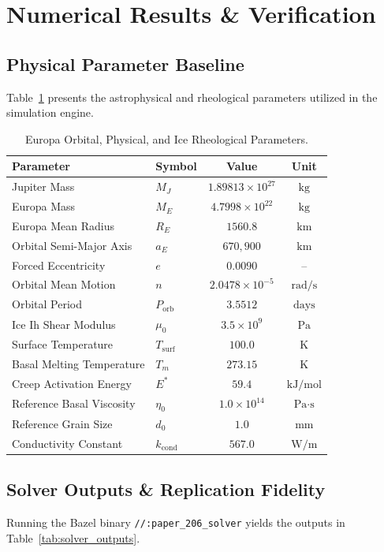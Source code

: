 \documentclass[11pt,a4paper]{article}
\begin{document}
\section{Numerical Results \& Verification}

\subsection{Physical Parameter Baseline}
Table~\ref{tab:europa_params} presents the astrophysical and rheological parameters utilized in the simulation engine.

\begin{table}[htbp]
\centering
\caption{Europa Orbital, Physical, and Ice Rheological Parameters.}
\label{tab:europa_params}
\begin{tabular}{llcc}
\toprule
\textbf{Parameter} & \textbf{Symbol} & \textbf{Value} & \textbf{Unit} \\
\midrule
Jupiter Mass & $M_J$ & $1.89813 \times 10^{27}$ & $\text{kg}$ \\
Europa Mass & $M_E$ & $4.7998 \times 10^{22}$ & $\text{kg}$ \\
Europa Mean Radius & $R_E$ & $1560.8$ & $\text{km}$ \\
Orbital Semi-Major Axis & $a_E$ & $670,900$ & $\text{km}$ \\
Forced Eccentricity & $e$ & $0.0090$ & -- \\
Orbital Mean Motion & $n$ & $2.0478 \times 10^{-5}$ & $\text{rad/s}$ \\
Orbital Period & $P_{\mathrm{orb}}$ & $3.5512$ & $\text{days}$ \\
Ice Ih Shear Modulus & $\mu_0$ & $3.5 \times 10^9$ & $\text{Pa}$ \\
Surface Temperature & $T_{\mathrm{surf}}$ & $100.0$ & $\text{K}$ \\
Basal Melting Temperature & $T_m$ & $273.15$ & $\text{K}$ \\
Creep Activation Energy & $E^*$ & $59.4$ & $\text{kJ/mol}$ \\
Reference Basal Viscosity & $\eta_0$ & $1.0 \times 10^{14}$ & $\text{Pa}\cdot\text{s}$ \\
Reference Grain Size & $d_0$ & $1.0$ & $\text{mm}$ \\
Conductivity Constant & $k_{\mathrm{cond}}$ & $567.0$ & $\text{W/m}$ \\
\bottomrule
\end{tabular}
\end{table}

\subsection{Solver Outputs \& Replication Fidelity}
Running the Bazel binary \texttt{//:paper\_206\_solver} yields the outputs in Table~\ref{tab:solver_outputs}.
\end{document}
